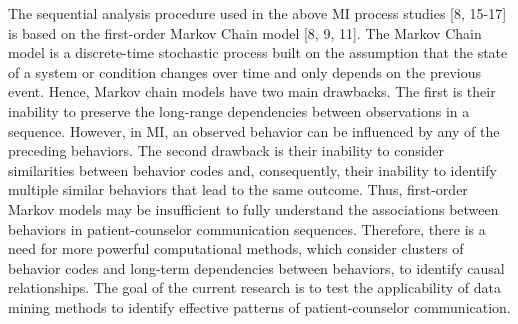 The sequential analysis procedure used in the above MI process studies [8, 15-17] is based on the first-order Markov Chain model [8, 9, 11]. The Markov Chain model is a discrete-time stochastic process built on the assumption that the state of a system or condition changes over time and only depends on the previous event. Hence, Markov chain models have two main drawbacks. The first is their inability to preserve the long-range dependencies between observations in a sequence. However, in MI, an observed behavior can be influenced by any of the preceding behaviors. The second drawback is their inability to consider similarities between behavior codes and, consequently, their inability to identify multiple similar behaviors that lead to the same outcome. Thus, first-order Markov models may be insufficient to fully understand the associations between behaviors in patient-counselor communication sequences. Therefore, there is a need for more powerful computational methods, which consider clusters of behavior codes and long-term dependencies between behaviors, to identify causal relationships. The goal of the current research is to test the applicability of data mining methods to identify effective patterns of patient-counselor communication.

